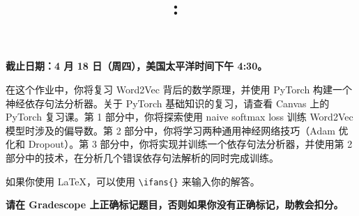 \documentclass[answers]{exam}
\title{
\vspace{-1in}
\textmd{\textbf{\hmwkClass:\ \hmwkTitle}}
}
\author{}
\date{}
\newif\ifanswers
\newcommand{\ifans}[1]{\ifanswers \color{red} \textbf{Solution: } #1 \color{black} \fi}
\begin{document}
\maketitle
\vspace{-3em}

\textbf{截止日期：4 月 18 日（周四），美国太平洋时间下午 4:30。}

在这个作业中，你将复习 Word2Vec 背后的数学原理，并使用 PyTorch 构建一个神经依存句法分析器。关于 PyTorch 基础知识的复习，请查看 Canvas 上的 PyTorch 复习课。第 1 部分中，你将探索使用 naive softmax loss 训练 Word2Vec 模型时涉及的偏导数。第 2 部分中，你将学习两种通用神经网络技巧（Adam 优化和 Dropout）。第 3 部分中，你将实现并训练一个依存句法分析器，并使用第 2 部分中的技术，在分析几个错误依存句法解析的同时完成训练。

如果你使用 LaTeX，可以使用 \verb!\ifans{}! 来输入你的解答。

\textbf{请在 Gradescope 上正确标记题目，否则如果你没有正确标记，助教会扣分。}
\begin{questions}
    
    \newpage
    
    \newpage
    
\end{questions}


\end{document}

